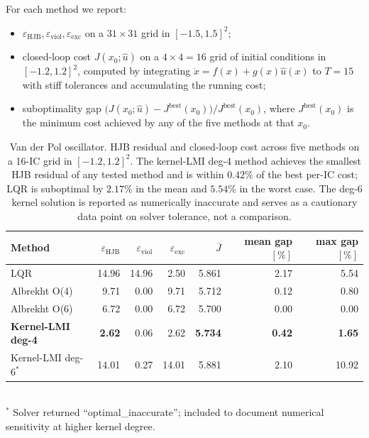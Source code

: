 \documentclass[11pt]{article}
\begin{document}
For each method we report:
\begin{itemize}
\item $\varepsilon_{\mathrm{HJB}}, \varepsilon_{\mathrm{viol}}, \varepsilon_{\mathrm{exc}}$ on a $31\times 31$ grid in $[-1.5, 1.5]^2$;
\item closed-loop cost $J(x_0;\hat u)$ on a $4\times 4 = 16$ grid of initial conditions in $[-1.2, 1.2]^2$, computed by integrating $\dot x = f(x) + g(x)\hat u(x)$ to $T = 15$ with stiff tolerances and accumulating the running cost;
\item suboptimality gap $\bigl(J(x_0;\hat u) - J^{\mathrm{best}}(x_0)\bigr)/J^{\mathrm{best}}(x_0)$, where $J^{\mathrm{best}}(x_0)$ is the minimum cost achieved by any of the five methods at that $x_0$.
\end{itemize}

\begin{table}[h]
\centering
\caption{Van der Pol oscillator. HJB residual and closed-loop cost across five methods on a 16-IC grid in $[-1.2, 1.2]^2$. The kernel-LMI deg-4 method achieves the smallest HJB residual of any tested method and is within $0.42\%$ of the best per-IC cost; LQR is suboptimal by $2.17\%$ in the mean and $5.54\%$ in the worst case. The deg-6 kernel solution is reported as numerically inaccurate and serves as a cautionary data point on solver tolerance, not a comparison.}
\label{tab:vdp_optimality}
\begin{tabular}{lrrrrrr}
\toprule
Method & $\varepsilon_{\mathrm{HJB}}$ & $\varepsilon_{\mathrm{viol}}$ & $\varepsilon_{\mathrm{exc}}$ & $\overline{J}$ & mean gap $[\%]$ & max gap $[\%]$ \\
\midrule
LQR              & 14.96 & 14.96 & 2.50 & 5.861 & 2.17 & 5.54 \\
Albrekht O(4)    & 9.71 & 0.00 & 9.71 & 5.712 & 0.12 & 0.80 \\
Albrekht O(6)    & 6.72 & 0.00 & 6.72 & 5.700 & 0.00 & 0.00 \\
\textbf{Kernel-LMI deg-4} & \textbf{2.62} & 0.06 & 2.62 & \textbf{5.734} & \textbf{0.42} & \textbf{1.65} \\
Kernel-LMI deg-6$^*$ & 14.01 & 0.27 & 14.01 & 5.881 & 2.10 & 10.92 \\
\bottomrule
\end{tabular}
\\[4pt]
{\footnotesize $^*$ Solver returned ``optimal\_inaccurate''; included to document numerical sensitivity at higher kernel degree.}
\end{table}
\end{document}

